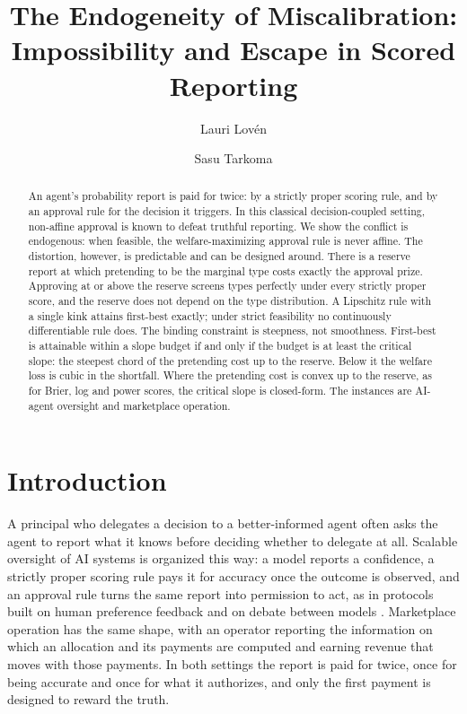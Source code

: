\documentclass[acmsmall,nonacm,screen]{acmart}
\title[The Endogeneity of Miscalibration]{The Endogeneity of Miscalibration: \\
  Impossibility and Escape in Scored Reporting}
\author{Lauri Lov\'{e}n}
\affiliation{%
  \institution{Future Computing Group, University of Oulu}
  \city{Oulu}
  \country{Finland}
}
\author{Sasu Tarkoma}
\affiliation{%
  \institution{University of Oulu and University of Helsinki}
  \city{Oulu / Helsinki}
  \country{Finland}
}
\theoremstyle{acmplain}%
\theoremstyle{acmdefinition}%
\numberwithin{equation}{section}
\begin{document}
\begin{abstract}
An agent's probability report is paid for twice: by a strictly proper scoring rule, and by an approval rule for the decision it triggers. In this classical decision-coupled setting, non-affine approval is known to defeat truthful reporting. We show the conflict is endogenous: when feasible, the welfare-maximizing approval rule is never affine. The distortion, however, is predictable and can be designed around. There is a reserve report at which pretending to be the marginal type costs exactly the approval prize. Approving at or above the reserve screens types perfectly under every strictly proper score, and the reserve does not depend on the type distribution. A Lipschitz rule with a single kink attains first-best exactly; under strict feasibility no continuously differentiable rule does. The binding constraint is steepness, not smoothness. First-best is attainable within a slope budget if and only if the budget is at least the critical slope: the steepest chord of the pretending cost up to the reserve. Below it the welfare loss is cubic in the shortfall. Where the pretending cost is convex up to the reserve, as for Brier, log and power scores, the critical slope is closed-form. The instances are AI-agent oversight and marketplace operation.
\end{abstract}

\maketitle


\section{Introduction}\label{sec:intro}

A principal who delegates a decision to a better-informed agent often asks the agent to report what it knows before deciding whether to delegate at all. Scalable oversight of AI systems is organized this way: a model reports a confidence, a strictly proper scoring rule pays it for accuracy once the outcome is observed, and an approval rule turns the same report into permission to act, as in protocols built on human preference feedback \citep{christiano2017preferences} and on debate between models \citep{irving2018debate}. Marketplace operation has the same shape, with an operator reporting the information on which an allocation and its payments are computed and earning revenue that moves with those payments. In both settings the report is paid for twice, once for being accurate and once for what it authorizes, and only the first payment is designed to reward the truth.
\end{document}
